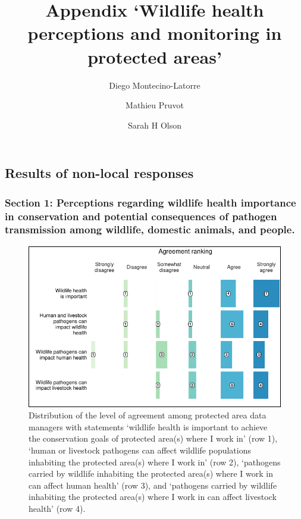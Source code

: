 \documentclass[
  letterpaper,
  DIV=11,
  numbers=noendperiod]{scrartcl}
\title{Appendix `Wildlife health perceptions and monitoring in protected
areas'}
\author{Diego Montecino-Latorre \and Mathieu Pruvot \and Sarah H Olson}
\date{}
\begin{document}
\maketitle
\ifdefined\Shaded\renewenvironment{Shaded}{\begin{tcolorbox}[sharp corners, interior hidden, frame hidden, enhanced, borderline west={3pt}{0pt}{shadecolor}, breakable, boxrule=0pt]}{\end{tcolorbox}}\fi

\hypertarget{results-of-non-local-responses}{%
\subsection{Results of non-local
responses}\label{results-of-non-local-responses}}

\hypertarget{section-1-perceptions-regarding-wildlife-health-importance-in-conservation-and-potential-consequences-of-pathogen-transmission-among-wildlife-domestic-animals-and-people.}{%
\subsubsection{Section 1: Perceptions regarding wildlife health
importance in conservation and potential consequences of pathogen
transmission among wildlife, domestic animals, and
people.}\label{section-1-perceptions-regarding-wildlife-health-importance-in-conservation-and-potential-consequences-of-pathogen-transmission-among-wildlife-domestic-animals-and-people.}}

\begin{figure}[H]

{\centering \includegraphics{Appendix_final_files/figure-pdf/section 1 plot-1.pdf}

}

\caption{Distribution of the level of agreement among protected area
data managers with statements `wildlife health is important to achieve
the conservation goals of protected area(s) where I work in' (row 1),
`human or livestock pathogens can affect wildlife populations inhabiting
the protected area(s) where I work in' (row 2), `pathogens carried by
wildlife inhabiting the protected area(s) where I work in can affect
human health' (row 3), and `pathogens carried by wildlife inhabiting the
protected area(s) where I work in can affect livestock health' (row 4).}

\end{figure}
\end{document}
